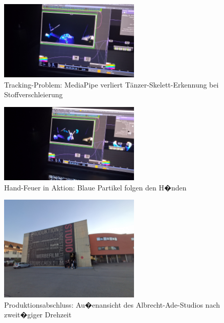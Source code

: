 \begin{figure}[!htbp]
   \centering
   \includegraphics[width=0.6\textwidth,height=0.25\textheight,keepaspectratio]{images/DancerNotMediaPipeFoundCorrectlyWhenInClothOnFloor.png}
   \caption{Tracking-Problem: MediaPipe verliert Tänzer-Skelett-Erkennung bei Stoffverschleierung}
   \label{fig:cloth_tracking_issue}
\end{figure}

\begin{figure}[!htbp]
   \centering
   \includegraphics[width=0.6\textwidth,height=0.25\textheight,keepaspectratio]{images/dancerWithHandFireViewFromKinect.png}
   \caption{Hand-Feuer in Aktion: Blaue Partikel folgen den H�nden}
   \label{fig:hand_fire_action}
\end{figure}

\begin{figure}[!htbp]
   \centering
   \includegraphics[width=0.6\textwidth,height=0.25\textheight,keepaspectratio]{images/onSetImages/WideShotOfOutsideOfStudioAfter2DayShoot.jpg}
   \caption{Produktionsabschluss: Au�enansicht des Albrecht-Ade-Studios nach zweit�giger Drehzeit}
   \label{fig:studio_exterior}
\end{figure}

